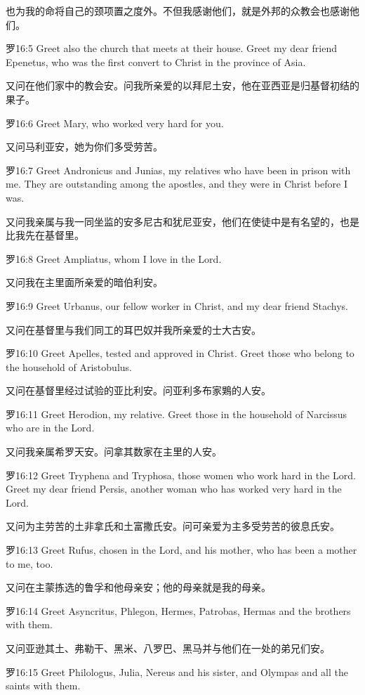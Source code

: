 \documentclass[a4paper,11pt,onecolumn,twoside]{ctexart}
\begin{document}
\begin{multicols}{2}
 也为我的命将自己的颈项置之度外。不但我感谢他们，就是外邦的众教会也感谢他们。


 罗16:5
 Greet also the church that meets at their house. Greet my dear friend Epenetus, who was the first convert to Christ in the province of Asia.

 又问在他们家中的教会安。问我所亲爱的以拜尼土安，他在亚西亚是归基督初结的果子。


 罗16:6
 Greet Mary, who worked very hard for you.

 又问马利亚安，她为你们多受劳苦。


 罗16:7
 Greet Andronicus and Junias, my relatives who have been in prison with me. They are outstanding among the apostles, and they were in Christ before I was.

 又问我亲属与我一同坐监的安多尼古和犹尼亚安，他们在使徒中是有名望的，也是比我先在基督里。


 罗16:8
 Greet Ampliatus, whom I love in the Lord.

 又问我在主里面所亲爱的暗伯利安。


 罗16:9
 Greet Urbanus, our fellow worker in Christ, and my dear friend Stachys.

 又问在基督里与我们同工的耳巴奴并我所亲爱的士大古安。


 罗16:10
 Greet Apelles, tested and approved in Christ. Greet those who belong to the household of Aristobulus.

 又问在基督里经过试验的亚比利安。问亚利多布家鶪的人安。


 罗16:11
 Greet Herodion, my relative. Greet those in the household of Narcissus who are in the Lord.

 又问我亲属希罗天安。问拿其数家在主里的人安。


 罗16:12
 Greet Tryphena and Tryphosa, those women who work hard in the Lord. Greet my dear friend Persis, another woman who has worked very hard in the Lord.

 又问为主劳苦的土非拿氏和土富撒氏安。问可亲爱为主多受劳苦的彼息氏安。


 罗16:13
 Greet Rufus, chosen in the Lord, and his mother, who has been a mother to me, too.

 又问在主蒙拣选的鲁孚和他母亲安；他的母亲就是我的母亲。


 罗16:14
 Greet Asyncritus, Phlegon, Hermes, Patrobas, Hermas and the brothers with them.

 又问亚逊其土、弗勒干、黑米、八罗巴、黑马并与他们在一处的弟兄们安。


 罗16:15
 Greet Philologus, Julia, Nereus and his sister, and Olympas and all the saints with them.


\end{multicols}
\end{document}
